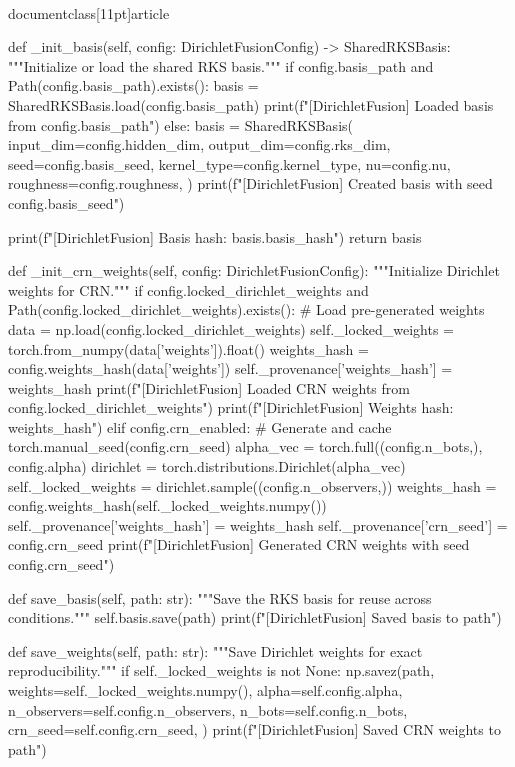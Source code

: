 \\documentclass[11pt]{article}
\begin{document}
\begin{CodeBlock}
    def _init_basis(self, config: DirichletFusionConfig) -> SharedRKSBasis:
        """Initialize or load the shared RKS basis."""
        if config.basis_path and Path(config.basis_path).exists():
            basis = SharedRKSBasis.load(config.basis_path)
            print(f"[DirichletFusion] Loaded basis from {config.basis_path}")
        else:
            basis = SharedRKSBasis(
                input_dim=config.hidden_dim,
                output_dim=config.rks_dim,
                seed=config.basis_seed,
                kernel_type=config.kernel_type,
                nu=config.nu,
                roughness=config.roughness,
            )
            print(f"[DirichletFusion] Created basis with seed {config.basis_seed}")
        
        print(f"[DirichletFusion] Basis hash: {basis.basis_hash}")
        return basis
    
    def _init_crn_weights(self, config: DirichletFusionConfig):
        """Initialize Dirichlet weights for CRN."""
        if config.locked_dirichlet_weights and Path(config.locked_dirichlet_weights).exists():
            # Load pre-generated weights
            data = np.load(config.locked_dirichlet_weights)
            self._locked_weights = torch.from_numpy(data['weights']).float()
            weights_hash = config.weights_hash(data['weights'])
            self._provenance['weights_hash'] = weights_hash
            print(f"[DirichletFusion] Loaded CRN weights from {config.locked_dirichlet_weights}")
            print(f"[DirichletFusion] Weights hash: {weights_hash}")
        elif config.crn_enabled:
            # Generate and cache
            torch.manual_seed(config.crn_seed)
            alpha_vec = torch.full((config.n_bots,), config.alpha)
            dirichlet = torch.distributions.Dirichlet(alpha_vec)
            self._locked_weights = dirichlet.sample((config.n_observers,))
            weights_hash = config.weights_hash(self._locked_weights.numpy())
            self._provenance['weights_hash'] = weights_hash
            self._provenance['crn_seed'] = config.crn_seed
            print(f"[DirichletFusion] Generated CRN weights with seed {config.crn_seed}")
    
    def save_basis(self, path: str):
        """Save the RKS basis for reuse across conditions."""
        self.basis.save(path)
        print(f"[DirichletFusion] Saved basis to {path}")
    
    def save_weights(self, path: str):
        """Save Dirichlet weights for exact reproducibility."""
        if self._locked_weights is not None:
            np.savez(path, 
                weights=self._locked_weights.numpy(),
                alpha=self.config.alpha,
                n_observers=self.config.n_observers,
                n_bots=self.config.n_bots,
                crn_seed=self.config.crn_seed,
            )
            print(f"[DirichletFusion] Saved CRN weights to {path}")
    

\end{CodeBlock}
\end{document}
